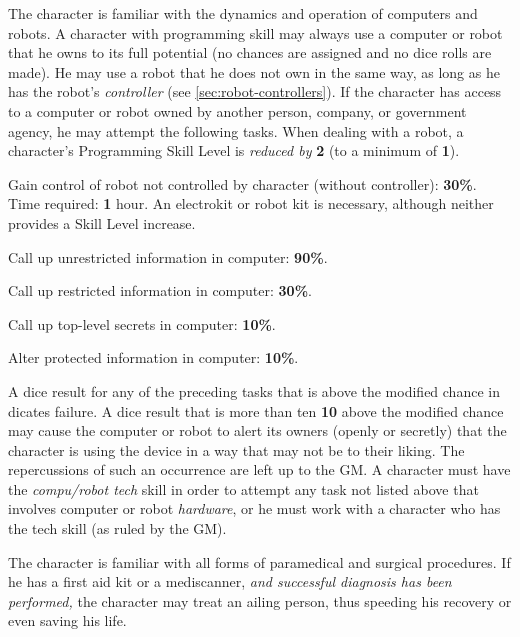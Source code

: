\label{sec:skill-programming}

The character is familiar with the dynamics and operation of computers
and robots.  A character with programming skill may always use a
computer or robot that he owns to its full potential (no chances are
assigned and no dice rolls are made).  He may use a robot that he does
not own in the same way, as long as he has the robot's
\emph{controller} (see \ref{sec:robot-controllers}).  If the character
has access to a computer or robot owned by another person, company, or
government agency, he may attempt the following tasks.  When dealing
with a robot, a character's Programming Skill Level is \emph{reduced
  by} \textbf{2} (to a minimum of \textbf{1}).

\begin{tasklist}
\item Gain control of robot not controlled by character (without
  controller): \textbf{30\%}.  Time required: \textbf{1} hour.  An
  electrokit or robot kit is necessary, although neither provides a
  Skill Level increase.
\item Call up unrestricted information in computer: \textbf{90\%}.   
\item Call up restricted information in computer: \textbf{30\%}.   
\item Call up top-level secrets in computer:  \textbf{10\%}.  
\item Alter protected information in computer: \textbf{10\%}.   
\end{tasklist}

A dice result for any of the preceding tasks that is above the
modified chance in dicates failure.  A dice result that is more than
ten
\textbf{10}\label{sec:scientific-skills-change-ten}
above the modified chance may cause the computer or robot to alert its
owners (openly or secretly) that the character is using the device in
a way that may not be to their liking.  The repercussions of such an
occurrence are left up to the GM.  A character must have the
\emph{compu/robot tech} skill in order to attempt any task not listed
above that involves computer or robot \emph{hardware}, or he must work
with a character who has the tech skill (as ruled by the GM).

\label{sec:skill-treatment}

The character is familiar with all forms of paramedical and surgical
procedures.  If he has a first aid kit or a mediscanner, \emph{and
  successful diagnosis has been performed,} the character may treat an
ailing person, thus speeding his recovery or even saving his life.

